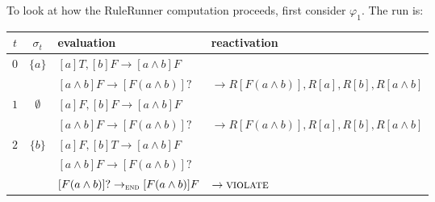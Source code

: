 To look at how the RuleRunner computation proceeds, first consider $\varphi_1$. The run is:
%
\noindent
\begin{center}\small
\begin{tabular}{c c l l}
\toprule
$t$ & $\sigma_t$ & evaluation & reactivation\\
\midrule
\multirow{2}{*}{$0$} & \multirow{2}{*}{$\{a\}$} & $[a]T,[b]F \rightarrow [a \land b]F$ & \\
& & $[a \land b]F \rightarrow [F(a \land b)]?$ & $\rightarrow R[F(a \land b)],R[a],R[b],R[a \land b]$\\[1.5ex]
\multirow{2}{*}{$1$} & \multirow{2}{*}{$\emptyset$} & $[a]F,[b]F \rightarrow [a \land b]F$ & \\
& & $[a \land b]F \rightarrow [F(a \land b)]?$ & $\rightarrow R[F(a \land b)],R[a],R[b],R[a \land b]$\\[1.5ex]
\multirow{3}{*}{$2$} & \multirow{3}{*}{$\{b\}$} & $[a]F,[b]T \rightarrow [a \land b]F$ & \\
& & $[a \land b]F \rightarrow [F(a \land b)]?$ & \\
& & $[F(a \land b)]? \rightarrow_{\textsc{end}} [F(a \land b)]F$ & $\rightarrow \textsc{violate}$ \\
\bottomrule
\end{tabular}
\end{center}

